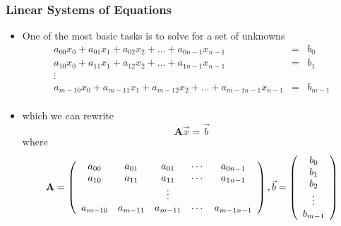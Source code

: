 \documentclass[10pt]{beamer}
\begin{document}
\begin{frame}
  \frametitle{Linear Systems of Equations}
  \begin{itemize}
  \item One of the most basic tasks is to solve for a set of unknowns
    \[
      \begin{array}{ccc}
        a_{00} x_0 + a_{01} x_1 + a_{02} x_2 + \ldots + a_{0n-1} x_{n-1} & = & b_0\\
        a_{10} x_0 + a_{11} x_1 + a_{12} x_2 + \ldots + a_{1n-1} x_{n-1} & = & b_1\\
        \vdots && \\
        a_{m-10} x_0 + a_{m-11} x_1 + a_{m-12} x_2 + \ldots + a_{m-1n-1} x_{n-1} & = & b_{m-1}\\
      \end{array}
    \]
    \pause
  \item which we can rewrite
    \[
      \mathbf{A} \vec{x} = \vec{b}
    \]
    where
    \[
      \mathbf{A} = \left(
        \begin{array}{ccccc}
          a_{00} & a_{01} & a_{01} & \cdots & a_{0n-1} \\
          a_{10} & a_{11} & a_{11} & \cdots & a_{1n-1} \\
          & &  \vdots & & \\
          a_{m-10} & a_{m-11} & a_{m-11} & \cdots & a_{m-1n-1} \\
        \end{array}\right), 
      \vspace{1cm} 
      \vec{b} = \left(
        \begin{array}{c}
          b_0 \\ b_1 \\ b_2 \\ \vdots \\ b_{m-1} \\
        \end{array}\right)
    \]
  \end{itemize}
\end{frame}
\end{document}
